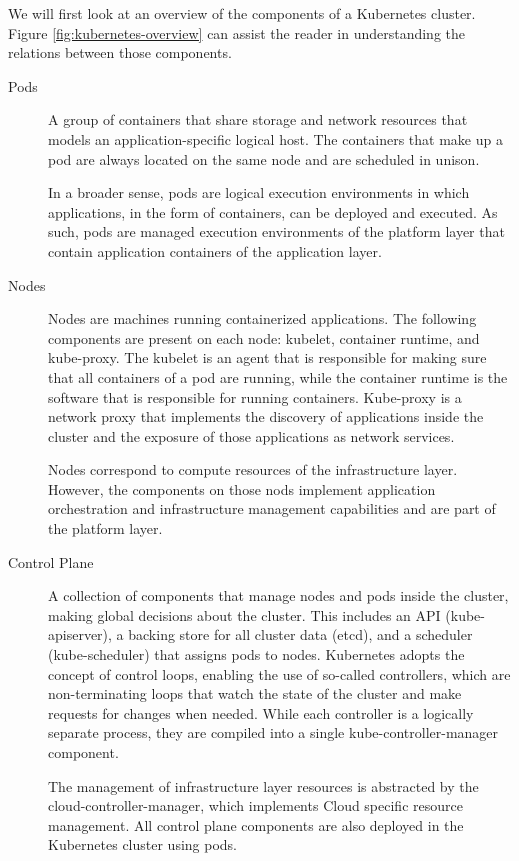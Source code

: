 We will first look at an overview of the components of a Kubernetes cluster.
Figure \ref{fig:kubernetes-overview} can assist the reader in understanding the
relations between those components.

\begin{description}
  \item[Pods]
    A group of containers that share storage and network resources that models
    an application-specific logical host. The containers that make up a pod are
    always located on the same node and are scheduled in unison.

    In a broader sense, pods are logical execution environments in which
    applications, in the form of containers, can be deployed and executed. As
    such, pods are managed execution environments of the platform layer that
    contain application containers of the application layer.

  \item[Nodes]
    Nodes are machines running containerized applications. The following
    components are present on each node: kubelet, container runtime, and
    kube-proxy. The kubelet is an agent that is responsible for making sure that
    all containers of a pod are running, while the container runtime is the
    software that is responsible for running containers. Kube-proxy is a network
    proxy that implements the discovery of applications inside the cluster and
    the exposure of those applications as network services.

    Nodes correspond to compute resources of the infrastructure layer. However,
    the components on those nods implement application orchestration and
    infrastructure management capabilities and are part of the platform layer.

  \item[Control Plane]
    A collection of components that manage nodes and pods inside the cluster,
    making global decisions about the cluster. This includes an API
    (kube-apiserver), a backing store for all cluster data (etcd), and a
    scheduler (kube-scheduler) that assigns pods to nodes. Kubernetes adopts the
    concept of control loops, enabling the use of so-called controllers, which
    are non-terminating loops that watch the state of the cluster and make
    requests for changes when needed. While each controller is a logically
    separate process, they are compiled into a single kube-controller-manager
    component.
    
    The management of infrastructure layer resources is abstracted by the
    cloud-controller-manager, which implements Cloud specific resource
    management. All control plane components are also deployed in the Kubernetes
    cluster using pods.
    

\end{description}

